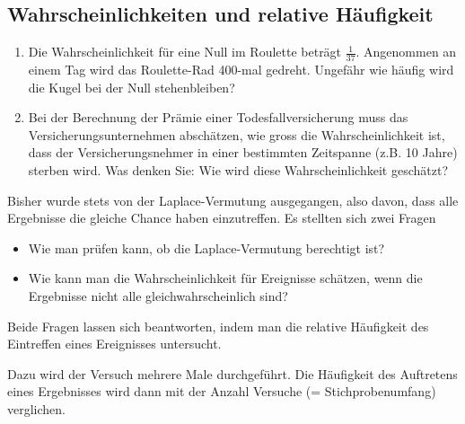 \subsection{Wahrscheinlichkeiten und relative Häufigkeit}
\begin{LA}
    {}{}
    \begin{enumerate}
        \item Die Wahrscheinlichkeit für eine Null im Roulette beträgt $\frac{1}{37}$. Angenommen an einem Tag wird das Roulette-Rad 400-mal gedreht. Ungefähr wie häufig wird die Kugel bei der Null stehenbleiben?
        \item Bei der Berechnung der Prämie einer Todesfallversicherung muss das Versicherungsunternehmen abschätzen, wie gross die Wahrscheinlichkeit ist, dass der Versicherungsnehmer in einer bestimmten Zeitspanne (z.B. 10 Jahre) sterben wird. Was denken Sie: Wie wird diese Wahrscheinlichkeit geschätzt?
    \end{enumerate}
\end{LA}
\pagebreak
Bisher wurde stets von der Laplace-Vermutung ausgegangen, also davon, dass alle Ergebnisse die gleiche Chance haben einzutreffen. Es stellten sich zwei Fragen
\begin{itemize}
    \item Wie man prüfen kann, ob die Laplace-Vermutung berechtigt ist?
    \item Wie kann man die Wahrscheinlichkeit für Ereignisse schätzen, wenn die Ergebnisse nicht alle gleichwahrscheinlich sind?
\end{itemize}

Beide Fragen lassen sich beantworten, indem man die relative Häufigkeit des Eintreffen eines Ereignisses untersucht.

Dazu wird der Versuch mehrere Male durchgeführt. Die Häufigkeit des Auftretens eines Ergebnisses wird dann mit der Anzahl Versuche (= Stichprobenumfang) verglichen.

